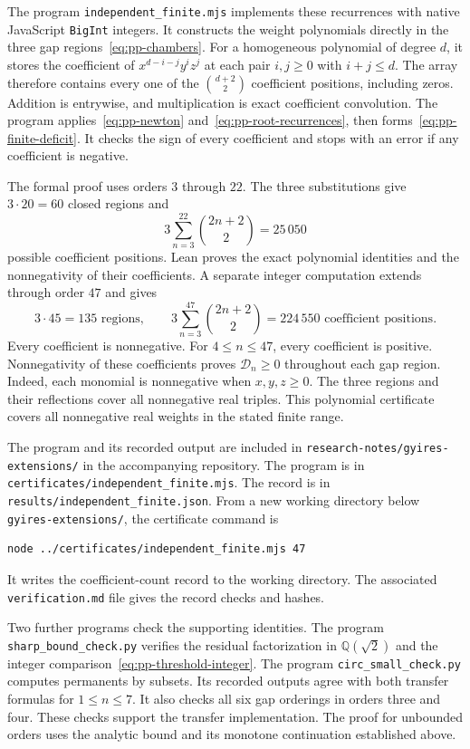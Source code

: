 \documentclass[11pt,a4paper]{article}
\theoremstyle{definition}
\theoremstyle{remark}
\begin{document}
The program \nolinkurl{independent_finite.mjs} implements these recurrences with native JavaScript \texttt{BigInt} integers.
It constructs the weight polynomials directly in the three gap regions~\eqref{eq:pp-chambers}.
For a homogeneous polynomial of degree $d$, it stores the coefficient of
$x^{d-i-j}y^iz^j$ at each pair $i,j\ge0$ with $i+j\le d$.
The array therefore contains every one of the $\binom{d+2}{2}$ coefficient positions, including zeros.
Addition is entrywise, and multiplication is exact coefficient convolution.
The program applies~\eqref{eq:pp-newton} and~\eqref{eq:pp-root-recurrences}, then forms~\eqref{eq:pp-finite-deficit}.
It checks the sign of every coefficient and stops with an error if any coefficient is negative.

The formal proof uses orders $3$ through $22$.
The three substitutions give $3\cdot20=60$ closed regions and
\[
3\sum_{n=3}^{22}\binom{2n+2}{2}=25\,050
\]
possible coefficient positions.
Lean proves the exact polynomial identities and the nonnegativity of their coefficients.
A separate integer computation extends through order $47$ and gives
\[
3\cdot45=135\text{ regions},\qquad
3\sum_{n=3}^{47}\binom{2n+2}{2}=224\,550\text{ coefficient positions}.
\]
Every coefficient is nonnegative.
For $4\le n\le47$, every coefficient is positive.
Nonnegativity of these coefficients proves $\mathcal D_n\ge0$ throughout each gap region.
Indeed, each monomial is nonnegative when $x,y,z\ge0$.
The three regions and their reflections cover all nonnegative real triples.
This polynomial certificate covers all nonnegative real weights in the stated finite range.

The program and its recorded output are included in
\nolinkurl{research-notes/gyires-extensions/} in the accompanying repository.
The program is in \nolinkurl{certificates/independent_finite.mjs}.
The record is in \nolinkurl{results/independent_finite.json}.
From a new working directory below \nolinkurl{gyires-extensions/}, the certificate command is
\begin{verbatim}
node ../certificates/independent_finite.mjs 47
\end{verbatim}
It writes the coefficient-count record to the working directory.
The associated \nolinkurl{verification.md} file gives the record checks and hashes.

Two further programs check the supporting identities.
The program \nolinkurl{sharp_bound_check.py} verifies the residual factorization in $\mathbb Q(\sqrt2)$ and the integer comparison~\eqref{eq:pp-threshold-integer}.
The program \nolinkurl{circ_small_check.py} computes permanents by subsets.
Its recorded outputs agree with both transfer formulas for $1\le n\le7$.
It also checks all six gap orderings in orders three and four.
These checks support the transfer implementation.
The proof for unbounded orders uses the analytic bound and its monotone continuation established above.
\end{document}
